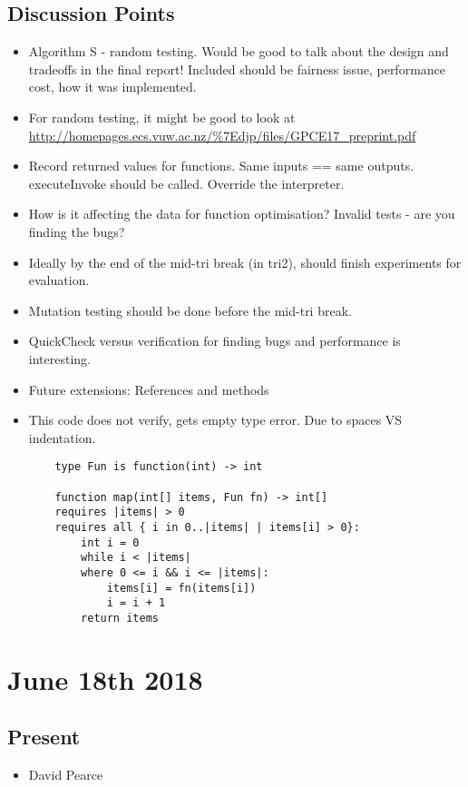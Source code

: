 \documentclass[]{article}
\begin{document}
\subsection{Discussion Points}
\begin{itemize}
	\item Algorithm S - random testing. Would be good to talk about the design and tradeoffs in the final report! Included should be fairness issue, performance cost, how it was implemented. 
	\item For random testing, it might be good to look at \url{http://homepages.ecs.vuw.ac.nz/%7Edjp/files/GPCE17_preprint.pdf}
	\item Record returned values for functions. Same inputs == same outputs. executeInvoke should be called. 
	Override the interpreter.
	\item How is it affecting the data for function optimisation? Invalid tests - are you finding the bugs?
	\item Ideally by the end of the mid-tri break (in tri2), should finish experiments for evaluation.
	\item Mutation testing should be done before the mid-tri break.
	\item QuickCheck versus verification for finding bugs and performance is interesting.
	\item Future extensions: References and methods
	\item This code does not verify, gets empty type error.
	Due to spaces VS indentation.
	
	\begin{verbatim}
	type Fun is function(int) -> int
	
	function map(int[] items, Fun fn) -> int[]
	requires |items| > 0 
	requires all { i in 0..|items| | items[i] > 0}:
	    int i = 0
	    while i < |items|
	    where 0 <= i && i <= |items|:
	        items[i] = fn(items[i])
	        i = i + 1
		return items
	\end{verbatim}
\end{itemize}


\section{June 18th 2018}
\subsection{Present}
\begin{itemize}
	\item David Pearce
\end{itemize}
\end{document}

